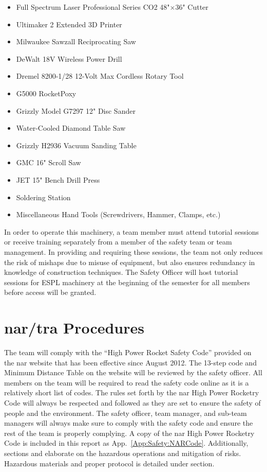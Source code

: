 \begin{itemize}[noitemsep]
    \item Full Spectrum Laser Professional Series CO2 48"$\times$36"  Cutter
    \item  Ultimaker 2 Extended 3D Printer
    \item Milwaukee Sawzall Reciprocating Saw
    \item DeWalt 18V Wireless Power Drill
    \item Dremel 8200-1/28 12-Volt Max Cordless Rotary Tool
    \item G5000 RocketPoxy
    \item Grizzly Model G7297 12" Disc Sander
    \item Water-Cooled Diamond Table Saw
    \item Grizzly H2936 Vacuum Sanding Table
    \item GMC 16" Scroll Saw
    \item JET 15" Bench Drill Press
    \item Soldering Station
    \item Miscellaneous Hand Tools (Screwdrivers, Hammer, Clamps, etc.)
\end{itemize}

In order to operate this machinery, a team member must attend tutorial sessions or receive training separately from a member of the safety team or team management. In providing and requiring these sessions, the team not only reduces the risk of mishaps due to misuse of equipment, but also ensures redundancy in knowledge of construction techniques. The Safety Officer will host tutorial sessions for ESPL machinery at the beginning of the semester for all members before access will be granted.

\section[NAR/TRA Procedures]{\gls{nar}/\gls{tra} Procedures}

The team will comply with the ``High Power Rocket Safety Code'' provided on the \gls{nar} website that has been effective since August 2012. The 13-step code and Minimum Distance Table on the website will be reviewed by the safety officer. All members on the team will be required to read the safety code online as it is a relatively short list of codes. The rules set forth by the \gls{nar} High Power Rocketry Code will always be respected and followed as they are set to ensure the safety of people and the environment. The safety officer, team manager, and sub-team managers will always make sure to comply with the safety code and ensure the rest of the team is properly complying. A copy of the \gls{nar} High Power Rocketry Code is included in this report as App.~\ref{App:Safety:NARCode}. Additionally, sections  and  elaborate on the hazardous operations and mitigation of risks. Hazardous materials and proper protocol is detailed under section.

